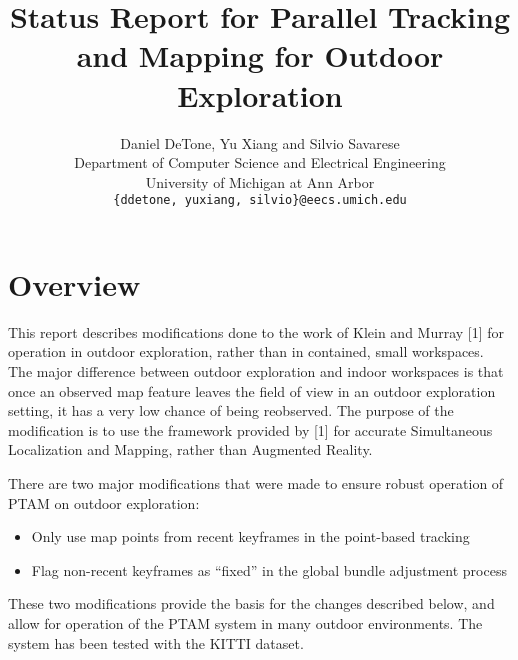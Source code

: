\documentclass[10pt,column,letterpaper]{article}
\begin{document}
\title{Status Report for Parallel Tracking and Mapping for Outdoor Exploration} %

\author{Daniel DeTone, Yu Xiang and Silvio Savarese \\
Department of Computer Science and Electrical Engineering\\
University of Michigan at Ann Arbor\\
{\tt\small \{ddetone, yuxiang, silvio\}@eecs.umich.edu}
}


\maketitle

\begin{abstract}


\end{abstract}

\section{Overview}

This report describes modifications done to the work of Klein and Murray [1] for operation in outdoor exploration, rather than in contained, small workspaces.  The major difference between outdoor exploration and indoor workspaces is that once an observed map feature leaves the field of view in an outdoor exploration setting, it has a very low chance of being reobserved. The purpose of the modification is to use the framework provided by [1] for accurate Simultaneous Localization and Mapping, rather than Augmented Reality. 

There are two major modifications that were made to ensure robust operation of PTAM on outdoor exploration:
\begin{itemize}
\item Only use map points from recent keyframes in the point-based tracking
\item Flag non-recent keyframes as ``fixed'' in the global bundle adjustment process
\end{itemize}
These two modifications provide the basis for the changes described below, and allow for operation of the PTAM system in many outdoor environments. The system has been tested with the KITTI dataset.
\end{document}
